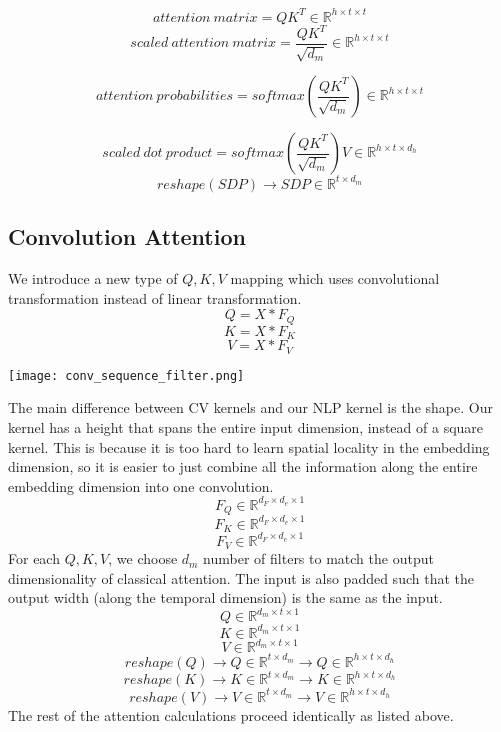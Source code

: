 \documentclass{article}
\begin{document}
	\[attention\ matrix = QK^T \in \mathbb{R}^{h \times t \times t}\]
	\[scaled\ attention\ matrix = \frac{QK^T}{\sqrt{d_m}} \in \mathbb{R}^{h \times t \times t}\]
	
	\[attention\ probabilities = softmax(\frac{QK^T}{\sqrt{d_m}}) \in \mathbb{R}^{h \times t \times t}\]
	
	\[scaled\ dot\ product = softmax(\frac{QK^T}{\sqrt{d_m}})V \in \mathbb{R}^{h \times t \times d_h}\]
	\[reshape(SDP) \rightarrow SDP \in \mathbb{R}^{t \times d_m}\]
	
	\subsection{Convolution Attention}
	We introduce a new type of \(Q, K, V\) mapping which uses convolutional transformation instead of linear transformation.
	\[Q = X \ast F_Q\]
	\[K = X \ast F_K\]
	\[V = X \ast F_V\]
	\begin{center}
		\texttt{[image: conv\_sequence\_filter.png]}
	\end{center}
	The main difference between CV kernels and our NLP kernel is the shape.  Our kernel has a height that spans the entire input dimension, instead of a square kernel.  This is because it is too hard to learn spatial locality in the embedding dimension, so it is easier to just combine all the information along the entire embedding dimension into one convolution.
	\[F_Q \in \mathbb{R}^{d_F \times d_e \times 1}\]
	\[F_K \in \mathbb{R}^{d_F \times d_e \times 1}\]
	\[F_V \in \mathbb{R}^{d_F \times d_e \times 1}\]
	For each \(Q, K, V\), we choose \(d_m\) number of filters to match the output dimensionality of classical attention.  The input is also padded such that the output width (along the temporal dimension) is the same as the input.
	\[Q \in \mathbb{R}^{d_m \times t \times 1}\]
	\[K \in \mathbb{R}^{d_m \times t \times 1}\]
	\[V \in \mathbb{R}^{d_m \times t \times 1}\]
	\[reshape(Q) \rightarrow Q \in \mathbb{R}^{t \times d_m} \rightarrow Q \in \mathbb{R}^{h \times t \times d_h}\]
	\[reshape(K) \rightarrow K \in \mathbb{R}^{t \times d_m} \rightarrow K \in \mathbb{R}^{h \times t \times d_h}\]
	\[reshape(V) \rightarrow V \in \mathbb{R}^{t \times d_m} \rightarrow V \in \mathbb{R}^{h \times t \times d_h}\]
	The rest of the attention calculations proceed identically as listed above.
\end{document}
